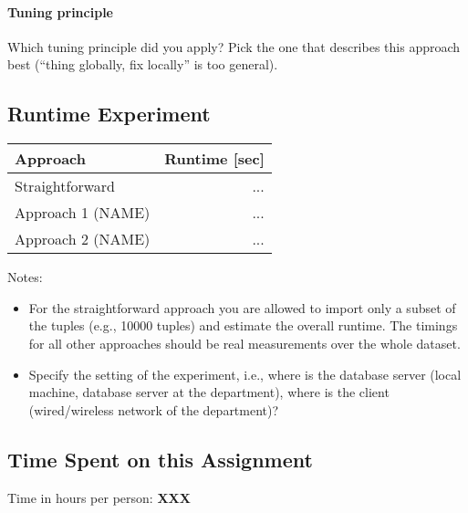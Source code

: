 \documentclass[11pt]{scrartcl}
\begin{document}
  \paragraph{Tuning principle}

  Which tuning principle did you apply? Pick the one that describes
  this approach best (``thing globally, fix locally'' is too general).

  \subsection*{Runtime Experiment}

  \begin{table}[H]
  \begin{tabular}{l|r}
    Approach & Runtime [sec] \\
    \hline
    Straightforward & ... \\
    Approach 1 (NAME) & ... \\
    Approach 2 (NAME) & ...     
  \end{tabular}
  \end{table}

  \bigskip

  \noindent Notes:
  \begin{itemize}
  \item For the straightforward approach you are allowed to import
    only a subset of the tuples (e.g., 10000 tuples) and estimate the
    overall runtime. The timings for all other approaches should be
    real measurements over the whole dataset.
  \item Specify the setting of the experiment, i.e., where is the
    database server (local machine, database server at the
    department), where is the client (wired/wireless network of the
    department)?
\end{itemize}

  \subsection*{Time Spent on this Assignment}

  Time in hours per person: {\bf XXX}
\end{document}
